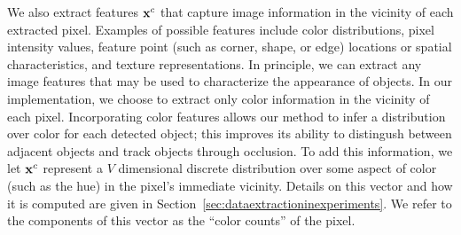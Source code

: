 \documentclass{article}
\begin{document}
We also extract features $\bold{x}^{c}$ that capture image information in the vicinity of each extracted pixel. Examples of possible features include color distributions, pixel intensity values, feature point (such as corner, shape, or edge) locations or spatial characteristics, and texture representations. In principle, we can extract any image features that may be used to characterize the appearance of objects. In our implementation, we choose to extract only color information in the vicinity of each pixel. Incorporating color features allows our method to infer a distribution over color for each detected object; this improves its ability to distingush between adjacent objects and track objects through occlusion. To add this information, we let $\bold{x}^{c}$ represent a $V$ dimensional discrete distribution over some aspect of color (such as the hue) in the pixel's immediate vicinity. Details on this vector and how it is computed are given in Section~\ref{sec:dataextractioninexperiments}. We refer to the components of this vector as the ``color counts'' of the pixel.




\end{document}
